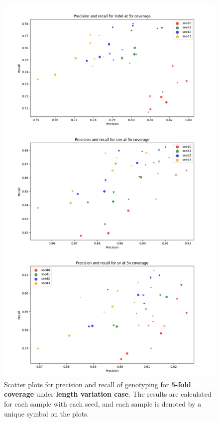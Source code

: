 \documentclass{PHlab-thesis}
\begin{document}
\begin{figure}[ht!]
	\centering
	\includegraphics[scale=0.5]{figures/len_genotyping_5x.png}
	\caption{Scatter plots for precision and recall of genotyping for \textbf{5-fold coverage} under \textbf{length variation case}. The results are calculated for each sample with each seed, and each sample is denoted by a unique symbol on the plots.}
	\label{fig:len_genotyping_5x} %
\end{figure}
\end{document}
